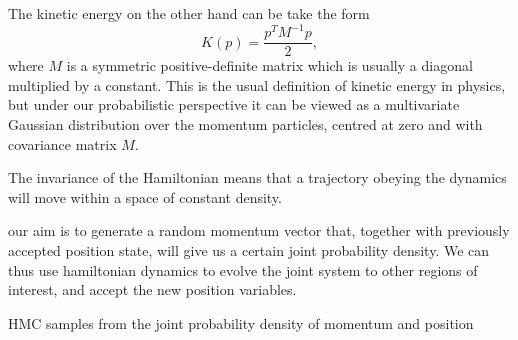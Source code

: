 The kinetic energy on the other hand can be take the form 
\begin{equation}
K(p)= \frac{p^T M^{-1}p}{2},
\end{equation}
where $M$ is a symmetric positive-definite matrix which is usually a diagonal multiplied by a constant. This is the usual definition of kinetic energy in physics, but under our probabilistic perspective it can be viewed as a multivariate Gaussian distribution over the momentum particles, centred at zero and with covariance matrix $M$.

The invariance of the Hamiltonian means that a trajectory obeying the dynamics will move within a space of constant density. 

our aim is to generate a random momentum vector that, together with previously accepted position state, will give us a certain joint probability density. We can thus use hamiltonian dynamics to evolve the joint system to other regions of interest, and accept the new position variables.  


HMC samples from the joint probability density of momentum and position